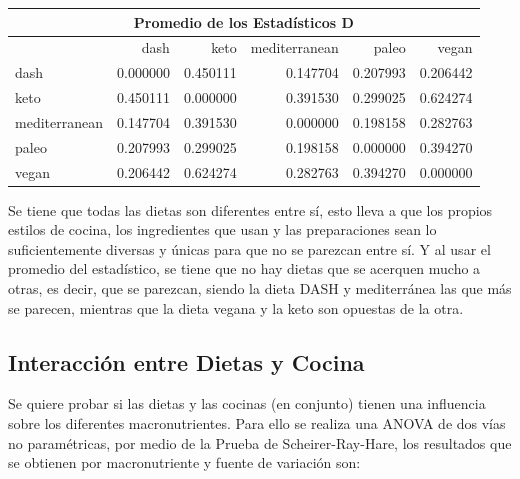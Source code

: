 \documentclass[12pt,a4paper]{article}
\begin{document}
{{            \begin{center}
                \begin{tabular}{l|rrrrr}
                \toprule
                    \multicolumn{6}{c}{Promedio de los Estadísticos D} \\
                \midrule
                    & dash & keto & mediterranean & paleo & vegan \\
                \midrule
                    dash          & 0.000000 & 0.450111 & 0.147704 & 0.207993 & 0.206442 \\
                    keto          & 0.450111 & 0.000000 & 0.391530 & 0.299025 & 0.624274 \\
                    mediterranean & 0.147704 & 0.391530 & 0.000000 & 0.198158 & 0.282763 \\
                    paleo         & 0.207993 & 0.299025 & 0.198158 & 0.000000 & 0.394270 \\
                    vegan         & 0.206442 & 0.624274 & 0.282763 & 0.394270 & 0.000000 \\
                \bottomrule
                \end{tabular}
            \end{center}

            Se tiene que todas las dietas son diferentes entre sí, esto lleva a que 
            los propios estilos de cocina, los ingredientes que usan y las preparaciones 
            sean lo suficientemente diversas y únicas para que no se parezcan entre sí. 
            Y al usar el promedio del estadístico, se tiene que no hay dietas que se acerquen 
            mucho a otras, es decir, que se parezcan, siendo la dieta DASH y mediterránea las 
            que más se parecen, mientras que la dieta vegana y la keto son opuestas de la otra. 
        }

        \subsection{Interacción entre Dietas y Cocina}
        {
            Se quiere probar si las dietas y las cocinas (en conjunto) tienen una influencia 
            sobre los diferentes macronutrientes. Para ello se realiza una ANOVA de dos vías 
            no paramétricas, por medio de la Prueba de Scheirer-Ray-Hare, los resultados que 
            se obtienen por macronutriente y fuente de variación son:

}}
\end{document}
